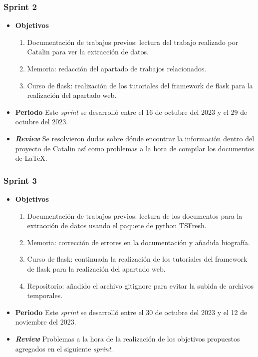 \subsubsection{Sprint 2}
\begin{itemize}
\item \textbf{Objetivos}
\begin{enumerate}
\item Documentación de trabajos previos: lectura del trabajo realizado por Catalin para ver la extracción de datos.
\item Memoria: redacción del apartado de trabajos relacionados.
\item Curso de flask: realización de los tutoriales del framework de flask para la realización del apartado web.
\end{enumerate}
\item \textbf{Periodo}
Este \textsl{sprint} se desarrolló entre el 16 de octubre del 2023 y el 29 de octubre del 2023.
\item \textbf{\textsl{Review}}
Se resolvieron dudas sobre dónde encontrar la información dentro del proyecto de Catalin así como problemas a la hora de compilar los documentos de \LaTeX . 


\end{itemize}
\subsubsection{Sprint 3}
\begin{itemize}
\item \textbf{Objetivos}
\begin{enumerate}
\item Documentación de trabajos previos: lectura de los documentos para la extracción de datos usando el paquete de python TSFresh.
\item Memoria: corrección de errores en la documentación y añadida biografía.
\item Curso de flask: continuada la realización de los tutoriales del framework de flask para la realización del apartado web.
\item Repositorio: añadido el archivo gitignore para evitar la subida de archivos temporales.
\end{enumerate}
\item \textbf{Periodo}
Este \textsl{sprint} se desarrolló entre el 30 de octubre del 2023 y el 12 de noviembre del 2023.
\item \textbf{\textsl{Review}}
Problemas a la hora de la realización de los objetivos propuestos agregados en el siguiente \textsl{sprint}. 


\end{itemize}

